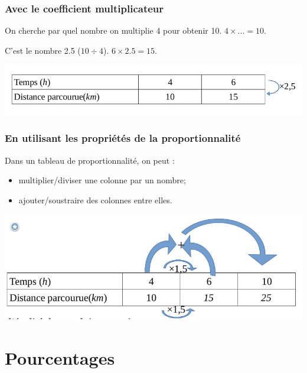 \documentclass[12pt,a4paper]{article}
\begin{document}
\subsubsection*{Avec le coefficient multiplicateur}

\begin{mymeth}
	On cherche par quel nombre on multiplie 4 pour obtenir 10. $4 \times ...= 10$.
	
	C’est le nombre \num{2.5} ($10 \div 4$). $6 \times \num{2.5} = 15$.
	
	
	\begin{center}
		\includegraphics[scale=0.5]{tab3_3}
	\end{center}
\end{mymeth}


\subsubsection*{En utilisant les propriétés de la proportionnalité}

\begin{myprop}
	Dans un tableau de proportionnalité, on peut :
		\begin{itemize}
			\item multiplier/diviser une colonne par un nombre;
			\item ajouter/soustraire des colonnes entre elles.
		\end{itemize}
	
	\begin{center}
		\includegraphics[scale=0.5]{tab3_4}
	\end{center}
\end{myprop}

\section{Pourcentages}
\end{document}
